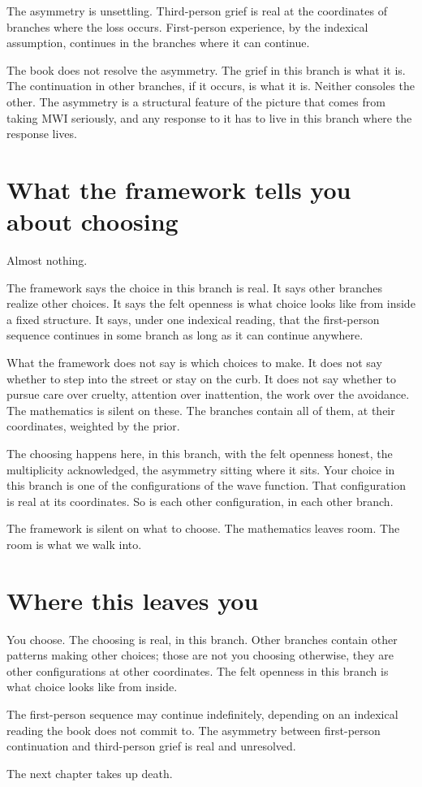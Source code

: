 The asymmetry is unsettling. Third-person grief is real at the coordinates of branches where the loss occurs. First-person experience, by the indexical assumption, continues in the branches where it can continue.

The book does not resolve the asymmetry. The grief in this branch is what it is. The continuation in other branches, if it occurs, is what it is. Neither consoles the other. The asymmetry is a structural feature of the picture that comes from taking MWI seriously, and any response to it has to live in this branch where the response lives.

\section*{What the framework tells you about choosing}

Almost nothing.

The framework says the choice in this branch is real. It says other branches realize other choices. It says the felt openness is what choice looks like from inside a fixed structure. It says, under one indexical reading, that the first-person sequence continues in some branch as long as it can continue anywhere.

What the framework does not say is which choices to make. It does not say whether to step into the street or stay on the curb. It does not say whether to pursue care over cruelty, attention over inattention, the work over the avoidance. The mathematics is silent on these. The branches contain all of them, at their coordinates, weighted by the prior.

The choosing happens here, in this branch, with the felt openness honest, the multiplicity acknowledged, the asymmetry sitting where it sits. Your choice in this branch is one of the configurations of the wave function. That configuration is real at its coordinates. So is each other configuration, in each other branch.

The framework is silent on what to choose. The mathematics leaves room. The room is what we walk into.

\section*{Where this leaves you}

You choose. The choosing is real, in this branch. Other branches contain other patterns making other choices; those are not you choosing otherwise, they are other configurations at other coordinates. The felt openness in this branch is what choice looks like from inside.

The first-person sequence may continue indefinitely, depending on an indexical reading the book does not commit to. The asymmetry between first-person continuation and third-person grief is real and unresolved.

The next chapter takes up death.
